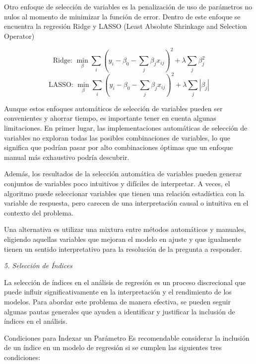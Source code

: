 \documentclass[
]{book}
\begin{document}
Otro enfoque de selección de variables es la penalización de uso de
parámetros no nulos al momento de minimizar la función de error. Dentro
de este enfoque se encuentra la regresión Ridge y LASSO (Least Absolute
Shrinkage and Selection Operator)

\[\text{Ridge: }\min_{β} \sum_{i}(y_i - \beta_0 - \sum_{j}\beta_{j}x_{ij})^2 + λ\sum_{j}\beta_{j}^2\]
\[\text{LASSO: }\min_{β}\sum_{i}(y_i - \beta_0 - \sum_{j}\beta_{j}x_{ij})^2 + λ\sum_{j}|\beta_{j}|\]

Aunque estos enfoques automáticos de selección de variables pueden ser
convenientes y ahorrar tiempo, es importante tener en cuenta algunas
limitaciones. En primer lugar, las implementaciones automáticas de
selección de variables no exploran todas las posibles combinaciones de
variables, lo que significa que podrían pasar por alto combinaciones
óptimas que un enfoque manual más exhaustivo podría descubrir.

Además, los resultados de la selección automática de variables pueden
generar conjuntos de variables poco intuitivos y difíciles de
interpretar. A veces, el algoritmo puede seleccionar variables que
tienen una relación estadística con la variable de respuesta, pero
carecen de una interpretación causal o intuitiva en el contexto del
problema.

Una alternativa es utilizar una mixtura entre métodos automáticos y
manuales, eligiendo aquellas variables que mejoran el modelo en ajuste y
que igualmente tienen un sentido interpretativo para la resolución de la
pregunta a responder.

\emph{5. Selección de Índices}

La selección de índices en el análisis de regresión es un proceso
discrecional que puede influir significativamente en la interpretación y
el rendimiento de los modelos. Para abordar este problema de manera
efectiva, se pueden seguir algunas pautas generales que ayuden a
identificar y justificar la inclusión de índices en el análisis.

Condiciones para Indexar un Parámetro Es recomendable considerar la
inclusión de un índice en un modelo de regresión si se cumplen las
siguientes tres condiciones:
\end{document}
